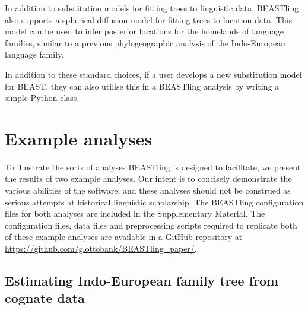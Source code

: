 \documentclass[10pt,a4paper]{article}
\begin{document}
In addition to substitution models for fitting trees to linguistic data, BEASTling also supports a spherical diffusion model\cite{Bouckaert2016} for fitting trees to location data.  This model can be used to infer posterior locations for the homelands of language families, similar to a previous phylogeographic analysis of the Indo-European language family\cite{Bouckaert2012}.

In addition to these standard choices, if a user develops a new substitution model for BEAST, they can also utilise this in a BEASTling analysis by writing a simple Python class.

\section{Example analyses}

To illustrate the sorts of analyses BEASTling is designed to facilitate, we present the results of two example analyses.  Our intent is to concisely demonstrate the various abilities of the software, and these analyses should not be construed as serious attempts at historical linguistic scholarship.  The BEASTling configuration files for both analyses are included in the Supplementary Material.  The configuration files, data files and preprocessing scripts required to replicate both of these example analyses are available in a GitHub repository at \url{https://github.com/glottobank/BEASTling_paper/}.

\subsection{Estimating Indo-European family tree from cognate data}
\end{document}
